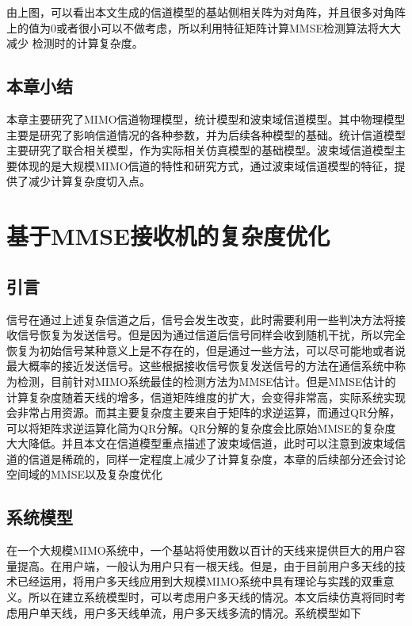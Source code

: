 \documentclass[bachelor,nocolorlinks, printoneside]{seuthesis} %
\begin{document}
\begin{Main}
由上图，可以看出本文生成的信道模型的基站侧相关阵为对角阵，并且很多对角阵上的值为0或者很小可以不做考虑，所以利用特征矩阵计算MMSE检测算法将大大减少
检测时的计算复杂度。

\section{本章小结}
本章主要研究了MIMO信道物理模型，统计模型和波束域信道模型。其中物理模型主要是研究了影响信道情况的各种参数，并为后续各种模型的基础。统计信道模型主要研究了联合相关模型，作为实际相关仿真模型的基础模型。波束域信道模型主要体现的是大规模MIMO信道的特性和研究方式，通过波束域信道模型的特征，提供了减少计算复杂度切入点。

\chapter{基于MMSE接收机的复杂度优化}
\section{引言}
信号在通过上述复杂信道之后，信号会发生改变，此时需要利用一些判决方法将接收信号恢复为发送信号。但是因为通过信道后信号同样会收到随机干扰，所以完全恢复为初始信号某种意义上是不存在的，但是通过一些方法，可以尽可能地或者说最大概率的接近发送信号。这些根据接收信号恢复发送信号的方法在通信系统中称为检测，目前针对MIMO系统最佳的检测方法为MMSE估计。但是MMSE估计的计算复杂度随着天线的增多，信道矩阵维度的扩大，会变得非常高，实际系统实现会非常占用资源。而其主要复杂度主要来自于矩阵的求逆运算，而通过QR分解，可以将矩阵求逆运算化简为QR分解。QR分解的复杂度会比原始MMSE的复杂度大大降低。并且本文在信道模型重点描述了波束域信道，此时可以注意到波束域信道的信道是稀疏的，同样一定程度上减少了计算复杂度，本章的后续部分还会讨论空间域的MMSE以及复杂度优化
\section{系统模型}
在一个大规模MIMO系统中，一个基站将使用数以百计的天线来提供巨大的用户容量提高。在用户端，一般认为用户只有一根天线。但是，由于目前用户多天线的技术已经运用，将用户多天线应用到大规模MIMO系统中具有理论与实践的双重意义。所以在建立系统模型时，可以考虑用户多天线的情况。本文后续仿真将同时考虑用户单天线，用户多天线单流，用户多天线多流的情况。系统模型如下


\end{Main}
\end{document}

